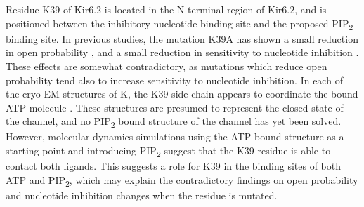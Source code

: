 Residue K39 of Kir6.2 is located in the N-terminal region of Kir6.2, and is positioned between the inhibitory nucleotide binding site and the proposed PIP\textsubscript{2} binding site.
In previous studies, the mutation K39A has shown a small reduction in open probability \cite{cukras_role_2002}, and a small reduction in sensitivity to nucleotide inhibition \cite{cukras_role_2002, tucker_molecular_1998}.
These effects are somewhat contradictory, as mutations which reduce open probability tend also to increase sensitivity to nucleotide inhibition.
In each of the cryo-EM structures of K\ATP{}, the K39 side chain appears to coordinate the bound ATP molecule \cite{lee_molecular_2017, martin_anti-diabetic_2017, li_structure_2017, puljung_cryo-electron_2018-1}.
These structures are presumed to represent the closed state of the channel, and no PIP\textsubscript{2} bound structure of the channel has yet been solved.
However, molecular dynamics simulations using the ATP-bound structure as a starting point and introducing PIP\textsubscript{2} suggest that the K39 residue is able to contact both ligands.
This suggests a role for K39 in the binding sites of both ATP and PIP\textsubscript{2}, which may explain the contradictory findings on open probability and nucleotide inhibition changes when the residue is mutated.


